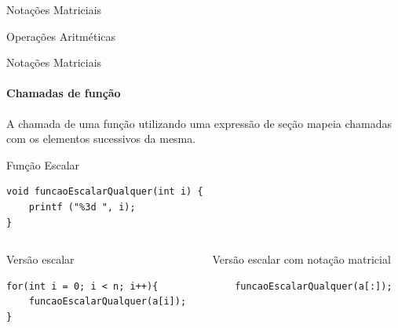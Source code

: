 \documentclass{beamer}
\begin{document}
{\begin{frame}[fragile]{Notações Matriciais}
\begin{scriptsize}
\begin{block}{Operações Aritméticas}
\end{block}
\end{scriptsize}

\end{frame}
}
\begin{frame}[fragile]{Notações Matriciais}
\framesubtitle{Chamadas de função}
   A chamada de uma função utilizando uma expressão de seção mapeia chamadas com os elementos sucessivos da mesma.

\begin{block}{Função Escalar}
\begin{lstlisting}
void funcaoEscalarQualquer(int i) {
    printf ("%3d ", i);
}
\end{lstlisting}
\end{block}
\pause
\begin{scriptsize}
\begin{columns}
\begin{column}{0.4\textwidth}
\begin{block}{Versão escalar} 
\begin{lstlisting}
for(int i = 0; i < n; i++){
    funcaoEscalarQualquer(a[i]);
}
\end{lstlisting}
\end{block}
\pause
\end{column}
\begin{column}{0.55\textwidth}
\begin{block}{Versão escalar com notação matricial} 
\begin{lstlisting}
    funcaoEscalarQualquer(a[:]);
\end{lstlisting}
\end{block}
\end{column}

\end{columns}
\end{scriptsize}
\end{frame}
\end{document}
